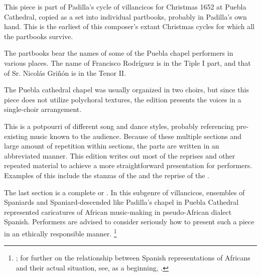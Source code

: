 
\begin{notesources}

\begin{source}
\end{source}

\end{notesources}

This piece is part of Padilla's cycle of villancicos for Christmas 1652 at Puebla Cathedral, copied as a set into individual partbooks, probably in Padilla's own hand.
This is the earliest of this composer's extant Christmas cycles for which all the partbooks survive.

The partbooks bear the names of some of the Puebla chapel performers in various places.
The name of Francisco Rodríguez is in the Tiple I part, and that of Sr. Nicolás Griñón is in the Tenor II.

The Puebla cathedral chapel was usually organized in two choirs, but since this piece does not utilize polychoral textures, the edition presents the voices in a single-choir arrangement.

This  is a potpourri of different song and dance styles, probably referencing pre-existing music known to the audience.
Because of these multiple sections and large amount of repetition within sections, the parts are written in an abbreviated manner.
This edition writes out most of the reprises and other repeated material to achieve a more straightforward presentation for performers.
Examples of this include the stanzas of the  and the  reprise of the .

The last section is a complete  or .
In this subgenre of villancicos, ensembles of Spaniards and Spaniard-descended  like Padilla's chapel in Puebla Cathedral represented caricatures of African music-making in pseudo-African dialect Spanish.
Performers are advised to consider seriously how to present such a piece in an ethically responsible manner.%
  \footnote{\autocites{Baker:EthnicVC}{Baker:PerformancePostColonial}; for further on the relationship between Spanish representations of Africans and their actual situation, see, as a beginning, \autocites{Molinero:Negros}{Lipski:AfroHispanic}{Fromont:DancingKingCongo}.}

